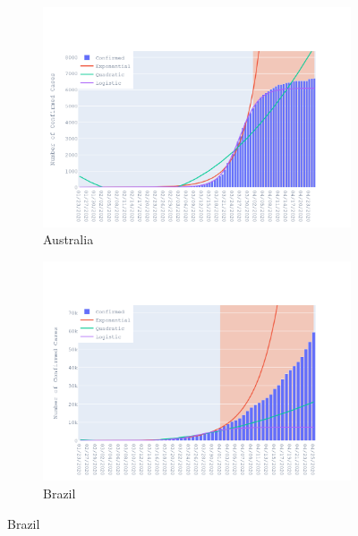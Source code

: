 \documentclass{homework}
\begin{document}
\begin{figure}[H]
  \centering
  \begin{subfigure}{0.45\linewidth}
    \includegraphics[width=\linewidth]{task1/Australia.png}
    \caption{Australia}
  \end{subfigure}
  \hfil
  \begin{subfigure}{0.45\linewidth}
    \includegraphics[width=\linewidth]{task1/Brazil.png}
    \caption{Brazil}
  \end{subfigure}


\end{figure}
\end{document}
